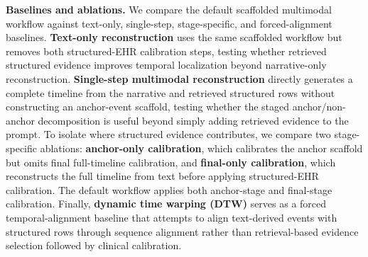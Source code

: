 \documentclass{ws-procs11x85}
\begin{document}
\textbf{Baselines and ablations.} We compare the default scaffolded multimodal workflow against text-only, single-step, stage-specific, and forced-alignment baselines. \textbf{Text-only reconstruction} uses the same scaffolded workflow but removes both structured-EHR calibration steps, testing whether retrieved structured evidence improves temporal localization beyond narrative-only reconstruction. \textbf{Single-step multimodal reconstruction} directly generates a complete timeline from the narrative and retrieved structured rows without constructing an anchor-event scaffold, testing whether the staged anchor/non-anchor decomposition is useful beyond simply adding retrieved evidence to the prompt. To isolate where structured evidence contributes, we compare two stage-specific ablations: \textbf{anchor-only calibration}, which calibrates the anchor scaffold but omits final full-timeline calibration, and \textbf{final-only calibration}, which reconstructs the full timeline from text before applying structured-EHR calibration. The default workflow applies both anchor-stage and final-stage calibration. Finally, \textbf{dynamic time warping (DTW)} serves as a forced temporal-alignment baseline that attempts to align text-derived events with structured rows through sequence alignment rather than retrieval-based evidence selection followed by clinical calibration.
\end{document}
